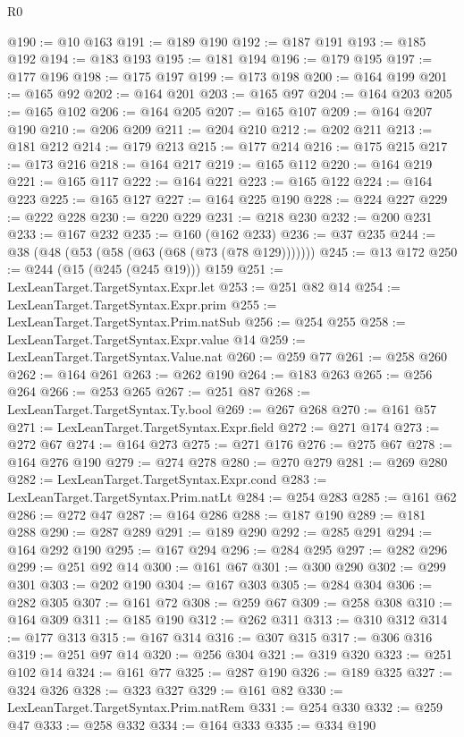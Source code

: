 \begin{lexlean}{R0}
\begin{coremodule}
@190 := @10 @163
@191 := @189 @190
@192 := @187 @191
@193 := @185 @192
@194 := @183 @193
@195 := @181 @194
@196 := @179 @195
@197 := @177 @196
@198 := @175 @197
@199 := @173 @198
@200 := @164 @199
@201 := @165 @92
@202 := @164 @201
@203 := @165 @97
@204 := @164 @203
@205 := @165 @102
@206 := @164 @205
@207 := @165 @107
@209 := @164 @207 @190
@210 := @206 @209
@211 := @204 @210
@212 := @202 @211
@213 := @181 @212
@214 := @179 @213
@215 := @177 @214
@216 := @175 @215
@217 := @173 @216
@218 := @164 @217
@219 := @165 @112
@220 := @164 @219
@221 := @165 @117
@222 := @164 @221
@223 := @165 @122
@224 := @164 @223
@225 := @165 @127
@227 := @164 @225 @190
@228 := @224 @227
@229 := @222 @228
@230 := @220 @229
@231 := @218 @230
@232 := @200 @231
@233 := @167 @232
@235 := @160 (@162 @233)
@236 := @37 @235
@244 := @38 (@48 (@53 (@58 (@63 (@68 (@73 (@78 @129)))))))
@245 := @13 @172
@250 := @244 (@15 (@245 (@245 @19))) @159
@251 := LexLeanTarget.TargetSyntax.Expr.let
@253 := @251 @82 @14
@254 := LexLeanTarget.TargetSyntax.Expr.prim
@255 := LexLeanTarget.TargetSyntax.Prim.natSub
@256 := @254 @255
@258 := LexLeanTarget.TargetSyntax.Expr.value @14
@259 := LexLeanTarget.TargetSyntax.Value.nat
@260 := @259 @77
@261 := @258 @260
@262 := @164 @261
@263 := @262 @190
@264 := @183 @263
@265 := @256 @264
@266 := @253 @265
@267 := @251 @87
@268 := LexLeanTarget.TargetSyntax.Ty.bool
@269 := @267 @268
@270 := @161 @57
@271 := LexLeanTarget.TargetSyntax.Expr.field
@272 := @271 @174
@273 := @272 @67
@274 := @164 @273
@275 := @271 @176
@276 := @275 @67
@278 := @164 @276 @190
@279 := @274 @278
@280 := @270 @279
@281 := @269 @280
@282 := LexLeanTarget.TargetSyntax.Expr.cond
@283 := LexLeanTarget.TargetSyntax.Prim.natLt
@284 := @254 @283
@285 := @161 @62
@286 := @272 @47
@287 := @164 @286
@288 := @187 @190
@289 := @181 @288
@290 := @287 @289
@291 := @189 @290
@292 := @285 @291
@294 := @164 @292 @190
@295 := @167 @294
@296 := @284 @295
@297 := @282 @296
@299 := @251 @92 @14
@300 := @161 @67
@301 := @300 @290
@302 := @299 @301
@303 := @202 @190
@304 := @167 @303
@305 := @284 @304
@306 := @282 @305
@307 := @161 @72
@308 := @259 @67
@309 := @258 @308
@310 := @164 @309
@311 := @185 @190
@312 := @262 @311
@313 := @310 @312
@314 := @177 @313
@315 := @167 @314
@316 := @307 @315
@317 := @306 @316
@319 := @251 @97 @14
@320 := @256 @304
@321 := @319 @320
@323 := @251 @102 @14
@324 := @161 @77
@325 := @287 @190
@326 := @189 @325
@327 := @324 @326
@328 := @323 @327
@329 := @161 @82
@330 := LexLeanTarget.TargetSyntax.Prim.natRem
@331 := @254 @330
@332 := @259 @47
@333 := @258 @332
@334 := @164 @333
@335 := @334 @190

\end{coremodule}
\end{lexlean}
